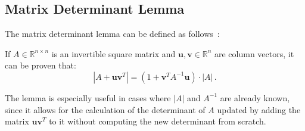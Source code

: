 \subsection{Matrix Determinant Lemma} \label{add:mat_det_lemma}
The matrix determinant lemma can be defined as follows~\cite{brookes1998matrix}:
    \begin{lemma}
        If $A\in\mathbb{R}^{n\times n}$ is an invertible square matrix and $\mathbf{u}, \mathbf{v} \in\mathbb{R}^n$ are column vectors, it can be proven that:
            \begin{equation*}
                |A + \mathbf{u}\mathbf{v}^T| = (1 + \mathbf{v}^T A^{-1} \mathbf{u}) \cdot |A|\,.
            \end{equation*}
    \end{lemma}

The lemma is especially useful in cases where $|A|$ and $A^{-1}$ are already known, since it allows for the calculation of the determinant of $A$ updated by adding the matrix $\mathbf{u}\mathbf{v}^T$ to it without computing the new determinant from scratch.